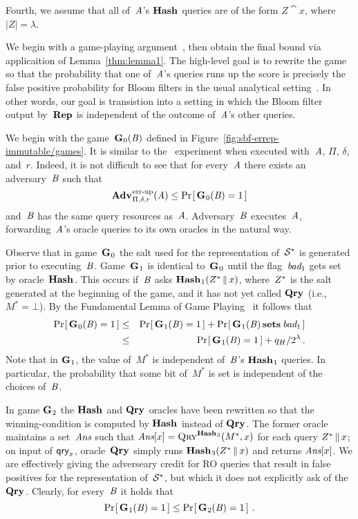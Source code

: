 Fourth, we assume that all of~$\mathit{A}$'s $\textup{\textbf{Hash}}\hspace{0.5pt}$ queries are of the form $Z\cat
x$, where $|Z| = \lambda$.

We begin with a game-playing argument~\cite{bellare2006triple}, then obtain the
final bound via applicaition of Lemma~\ref{thm:lemma1}.
%
%
The high-level goal is to rewrite the game so that the probability that one
of~$\mathit{A}$'s queries runs up the score is precisely the false positive
probability for Bloom filters in the usual analytical
setting~\cite{kirsch2006less}. In other words, our goal is transistion into a
setting in which the Bloom filter output by~$\textup{\textbf{Rep}}\hspace{0.5pt}$ is independent of the
outcome of~$\mathit{A}$'s other queries.

We begin with the game~$\textup{\textbf{G}}\hspace{0.5pt}_0(\mathit{B})$ defined in
Figure~\ref{fig:sbf-errep-immutable/games}. It is similar to the \errep\ experiment when
executed with~$\mathit{A}$, $\Pi$, $\delta$, and~$r$. Indeed, it is not difficult to
see that for every~$\mathit{A}$ there exists an adversary~$\mathit{B}$ such that
\begin{equation}
  \Adv{\errep}_{\Pi,\delta,r}(\advA) \leq \Prob{\game_0(\advB) = 1}
\end{equation}
and~$\mathit{B}$ has the same query resources as~$\mathit{A}$.
%
Adversary~$\mathit{B}$ executes~$\mathit{A}$, forwarding~$\mathit{A}$'s oracle queries
to its own oracles in the natural way.

Observe that in game~$\textup{\textbf{G}}\hspace{0.5pt}_0$ the salt used for the representation of~$\mathcal{S}^*$
is generated prior to executing~$\mathit{B}$. Game~$\textup{\textbf{G}}\hspace{0.5pt}_1$ is identical
to~$\textup{\textbf{G}}\hspace{0.5pt}_0$ until the flag~$\textit{bad}_1$ gets set by oracle~$\textup{\textbf{Hash}}\hspace{0.5pt}$. This occurs
if~$\mathit{B}$ asks $\textup{\textbf{Hash}}\hspace{0.5pt}_1(Z^* \, \| \, x)$, where~$Z^*$ is the salt generated
at the beginning of the game, and it has not yet called $\textup{\textbf{Qry}}\hspace{0.5pt}$ (i.e.,
$M^*=\bot$).
%
By the Fundamental Lemma of Game Playing~\cite{bellare2006triple} it follows
that
%
\begin{eqnarray}
  \Pr\hspace{-1pt}\left[\,\textup{\textbf{G}}\hspace{0.5pt}_0(\mathit{B})=1\,\right] &\leq&
    \Pr\hspace{-1pt}\left[\,\textup{\textbf{G}}\hspace{0.5pt}_1(\mathit{B})=1\,\right] + \Pr\hspace{-1pt}\left[\,\textup{\textbf{G}}\hspace{0.5pt}_1(\mathit{B}) \,\textup{\textbf{sets}}\hspace{0.5pt}\, \textit{bad}_1\,\right]\\
  &\leq&
    \Pr\hspace{-1pt}\left[\,\textup{\textbf{G}}\hspace{0.5pt}_1(\mathit{B})=1\,\right] + q_H/2^\lambda \,.
\end{eqnarray}
%
Note that in $\textup{\textbf{G}}\hspace{0.5pt}_1$, the value of~$M^*$ is independent of~$\mathit{B}$'s
$\textup{\textbf{Hash}}\hspace{0.5pt}_1$ queries. In particular, the probability that some bit of~$M^*$ is set
is independent of the choices of~$\mathit{B}$.

In game $\textup{\textbf{G}}\hspace{0.5pt}_2$ the $\textup{\textbf{Hash}}\hspace{0.5pt}$ and $\textup{\textbf{Qry}}\hspace{0.5pt}$ oracles have been rewritten so that
the winning-condition is computed by $\textup{\textbf{Hash}}\hspace{0.5pt}$ instead of $\textup{\textbf{Qry}}\hspace{0.5pt}$. The former
oracle maintains a set~$\textit{Ans}$ such that $\textit{Ans}[x] = \textnormal{\textsc{Qry}}^{\textup{\textbf{Hash}}\hspace{0.5pt}_3}(M^*, x)$ for
each query $Z^* \, \| \, x$; on input of $\mathsf{qry}_x$, oracle~$\textup{\textbf{Qry}}\hspace{0.5pt}$ simply runs
$\textup{\textbf{Hash}}\hspace{0.5pt}_3(Z^* \, \| \, x)$ and returns $\textit{Ans}[x]$.
%
We are effectively giving the adverseary credit for RO queries that result in
false positives for the representation of~$\mathcal{S}^*$, but which it does not
explicitly ask of the~$\textup{\textbf{Qry}}\hspace{0.5pt}$. Clearly, for every~$\mathit{B}$ it holds that
%
\begin{equation}
  \Pr\hspace{-1pt}\left[\,\textup{\textbf{G}}\hspace{0.5pt}_1(\mathit{B})=1\,\right] \leq \Pr\hspace{-1pt}\left[\,\textup{\textbf{G}}\hspace{0.5pt}_2(\mathit{B})=1\,\right] \,.
\end{equation}


